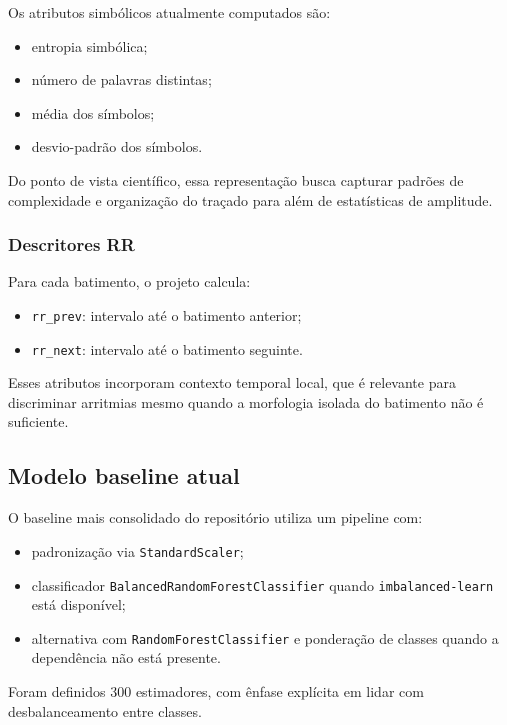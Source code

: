 \documentclass[12pt,a4paper]{article}
\begin{document}
Os atributos simb\'olicos atualmente computados s\~ao:

\begin{itemize}
    \item entropia simb\'olica;
    \item n\'umero de palavras distintas;
    \item m\'edia dos s\'imbolos;
    \item desvio-padr\~ao dos s\'imbolos.
\end{itemize}

Do ponto de vista cient\'ifico, essa representa\c{c}\~ao busca capturar padr\~oes de complexidade e organiza\c{c}\~ao do tra\c{c}ado para al\'em de estat\'isticas de amplitude.

\subsubsection{Descritores RR}
Para cada batimento, o projeto calcula:

\begin{itemize}
    \item \texttt{rr\_prev}: intervalo at\'e o batimento anterior;
    \item \texttt{rr\_next}: intervalo at\'e o batimento seguinte.
\end{itemize}

Esses atributos incorporam contexto temporal local, que \'e relevante para discriminar arritmias mesmo quando a morfologia isolada do batimento n\~ao \'e suficiente.

\subsection{Modelo baseline atual}
O baseline mais consolidado do reposit\'orio utiliza um pipeline com:

\begin{itemize}
    \item padroniza\c{c}\~ao via \texttt{StandardScaler};
    \item classificador \texttt{BalancedRandomForestClassifier} quando \texttt{imbalanced-learn} est\'a dispon\'ivel;
    \item alternativa com \texttt{RandomForestClassifier} e pondera\c{c}\~ao de classes quando a depend\^encia n\~ao est\'a presente.
\end{itemize}

Foram definidos 300 estimadores, com \^enfase expl\'icita em lidar com desbalanceamento entre classes.
\end{document}
